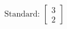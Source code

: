\documentclass[preview]{standalone}
\begin{document}
\begin{align*}
\text{Standard: } \begin{bmatrix} 3 \\ 2 \end{bmatrix}
\end{align*}
\end{document}
